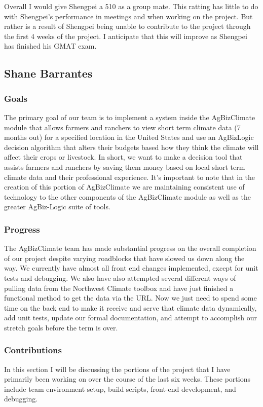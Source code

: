 \documentclass[onecolumn, draftclsnofoot,10pt, compsoc]{article}
\begin{document}
		Overall I would give Shengpei a 5\/10 as a group mate. This ratting has little to do with Shengpei's performance in meetings and when working on the project. But rather is a result of Shengpei being unable to contribute to the project through the first 4 weeks of the project. I anticipate that this will improve as Shengpei has finished his GMAT exam.\\





\subsection{Shane Barrantes}
	\subsubsection{Goals}
        The primary goal of our team is to implement a system inside the AgBizClimate module that allows farmers and ranchers to view short term climate data (7 months out) for a specified location in the United States and use an AgBizLogic decision algorithm that alters their budgets based how they think the climate will affect their crops or livestock. In short, we want to make a decision tool that assists farmers and ranchers by saving them money based on local short term climate data and their professional experience. It's important to note that in the creation of this portion of AgBizClimate we are maintaining consistent use of technology to the other components of the AgBizClimate module as well as the greater AgBiz-Logic suite of tools.
        \subsubsection{Progress}
	The AgBizClimate team has made substantial progress on the overall completion of our project despite varying roadblocks that have slowed us down along the way. We currently have almost all front end changes implemented, except for unit tests and debugging. We also have also attempted several different ways of pulling data from the Northwest Climate toolbox and have just finished a functional method to get the data via the URL. Now we just need to spend some time on the back end to make it receive and serve that climate data dynamically, add unit tests, update our formal documentation, and attempt to accomplish our stretch goals before the term is over.
	\subsubsection{Contributions}
	In this section I will be discussing the portions of the project that I have primarily been working on over the course of the last six weeks. These portions include team environment setup, build scripts, front-end development, and debugging.
\end{document}

